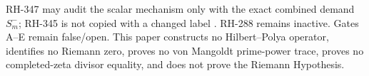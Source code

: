 \documentclass[11pt]{article}
\theoremstyle{remark}
\begin{document}
RH-347 may audit the scalar mechanism only with the exact combined demand
$S_m^-$; RH-345 is not copied with a changed label
\citep{WangCriticalPhase2026}.  RH-288 remains inactive.  Gates A--E remain
false/open.  This paper constructs no Hilbert--Polya operator, identifies no
Riemann zero, proves no von Mangoldt prime-power trace, proves no
completed-zeta divisor equality, and does not prove the Riemann Hypothesis.



\end{document}
